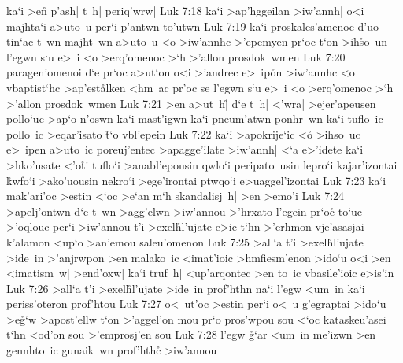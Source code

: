 ka`i
>e\r{n}
p'ash|
t~h|
periq'wrw|\bibvsend
\vs Luk 7:18
ka`i
>ap'hggeilan
>iw'annh|
o<i
majhta`i
a>uto~u
per`i
p'antwn
to'utwn\bibvsend
\vs Luk 7:19
ka`i
proskales'amenoc
d'uo
tin`ac
t~wn
majht~wn
a>uto~u
<o
>iw'annhc
>'epemyen
pr`oc
t`on
>ih\r{s}o~un
l'egwn
s`u
e>~i
<o
>erq'omenoc
>`h
>'allon
prosdok~wmen\bibvsend
\vs Luk 7:20
paragen'omenoi
d`e
pr`oc
a>ut`on
o<i
>'andrec
e>~ip\r{o}n
>iw'annhc
<o
vbaptist`hc
>ap'est\r{a}lken
<hm~ac
pr'oc
se
l'egwn
s`u
e>~i
<o
>erq'omenoc
>`h
>'allon
prosdok~wmen\bibvsend
\vs Luk 7:21
>en
a>ut~h|\r{}
d`e
t~h|
<'wra|
>ejer'apeusen
pollo`uc
>ap`o
n'oswn
ka`i
mast'igwn
ka`i
pneum'atwn
ponhr~wn
ka`i
tuflo~ic
pollo~ic
>eqar'isato
\r{t}`o
vbl'epein\bibvsend
\vs Luk 7:22
ka`i
>apokrije`ic
<o\r{}
>ihso~uc
e>~ipen
a>uto~ic
poreuj'entec
>apagge'ilate
>iw'annh|
<`a
e>'idete
ka`i
>hko'usate
<'o\r{t}i
tuflo`i
>anabl'epousin
qwlo`i
peripato~usin
lepro`i
kajar'izontai
\r{k}wfo`i
>ako'uousin
nekro`i
>ege'irontai
ptwqo`i
e>uaggel'izontai\bibvsend
\vs Luk 7:23
ka`i
mak'ari'oc
>estin
<`oc
>e`an
m`h
skandalisj~h|
>en
>emo'i\bibvsend
\vs Luk 7:24
>apelj'ontwn
d`e
t~wn
>agg'elwn
>iw'annou
>'hrxato
l'egein
pr`oc\r{}
to`uc
>'oqlouc
per`i
>iw'annou
t'i
>exel\r{h}l'ujate
e>ic
t`hn
>'erhmon
vje'asasjai
k'alamon
<up`o
>an'emou
saleu'omenon\bibvsend
\vs Luk 7:25
>all`a
t'i
>exel\r{h}l'ujate
>ide~in
>'anjrwpon
>en
malako~ic
<imat'ioic
>hmfiesm'enon
>ido`u
o<i
>en
<imatism~w|
>end'oxw|
ka`i
truf~h|
<up'arqontec
>en
to~ic
vbasile'ioic
e>is'in\bibvsend
\vs Luk 7:26
>all`a
t'i
>exel\r{h}l'ujate
>ide~in
prof'hthn
na`i
l'egw
<um~in
ka`i
periss'oteron
prof'htou\bibvsend
\vs Luk 7:27
o<~ut'oc
>estin
per`i
o<~u
g'egraptai
>ido`u
>e\r{g}`w
>apost'ellw
t`on
>'aggel'on
mou
pr`o
pros'wpou
sou
<`oc
kataskeu'asei
t`hn
<od'on
sou
>'emprosj'en
sou\bibvsend
\vs Luk 7:28
l'egw
\r{g}`ar
<um~in
me'izwn
>en
gennhto~ic
gunaik~wn
prof'hthc\r{}
>iw'annou
